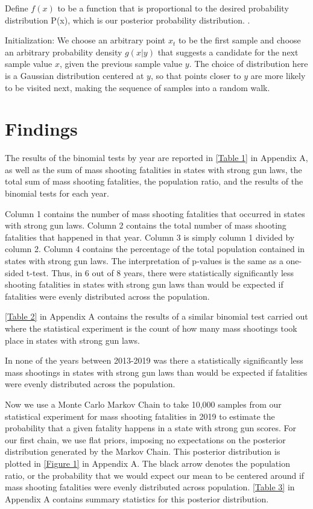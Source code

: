 \documentclass{article}
\begin{document}
Define $f(x)$ to be a function that is proportional to the desired probability distribution P(x), which is our posterior probability distribution. .

Initialization: We choose an arbitrary point $x_t$ to be the first sample and choose an arbitrary probability density $g(x| y)$ that suggests a candidate for the next sample value $x$, given the previous sample value $y$. The choice of distribution here is a Gaussian distribution centered at $y$, so that points closer to $y$ are more likely to be visited next, making the sequence of samples into a random walk.

\section{Findings}

The results of the binomial tests by year are reported in \ref{Table 1} in Appendix A, as well as the sum of mass shooting fatalities in states with strong gun laws, the total sum of mass shooting fatalities, the population ratio, and the results of the binomial tests for each year.  

Column 1 contains the number of mass shooting fatalities that occurred in states with strong gun laws. Column 2 contains the total number of mass shooting fatalities that happened in that year. Column 3 is simply column 1 divided by column 2. Column 4 contains the percentage of the total population contained in states with strong gun laws. The interpretation of p-values is the same as a one-sided t-test. Thus, in 6 out of 8 years, there were statistically significantly less shooting fatalities in states with strong gun laws than would be expected if fatalities were evenly distributed across the population. 
 
\ref{Table 2} in Appendix A contains the results of a similar binomial test carried out where the statistical experiment is the count of how many mass shootings took place in states with strong gun laws. 

In none of the years between 2013-2019 was there a statistically significantly less mass shootings in states with strong gun laws than would be expected if fatalities were evenly distributed across the population. 

Now we use a Monte Carlo Markov Chain to take 10,000 samples from our statistical experiment for mass shooting fatalities in 2019 to estimate the probability that a given fatality happens in a state with strong gun scores. For our first chain, we use flat priors, imposing no expectations on the posterior distribution generated by the Markov Chain. This posterior distribution is plotted in \ref{Figure 1} in Appendix A. The black arrow denotes the population ratio, or the probability that we would expect our mean to be centered around if mass shooting fatalities were evenly distributed across population. \ref{Table 3} in Appendix A contains summary statistics for this posterior distribution.
\end{document}
